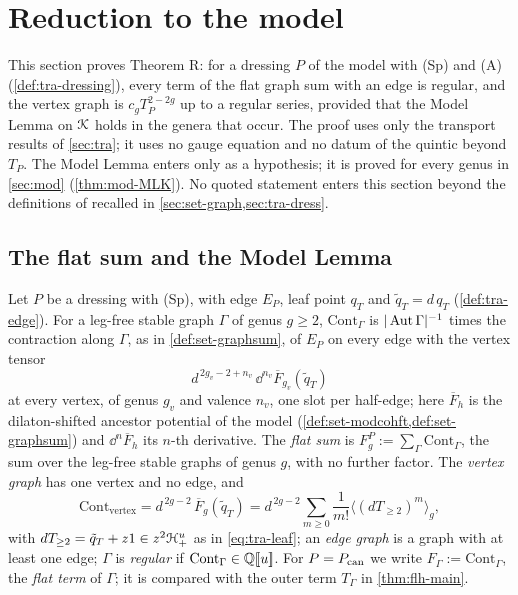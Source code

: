 
\section{Reduction to the model}
\label{sec:red}

This section proves Theorem R: for a dressing $P$ of the model with (Sp) and (A) (\cref{def:tra-dressing}), every term of the flat graph sum with an edge is regular, and the vertex graph is $c_gT_P^{2-2g}$ up to a regular series, provided that the Model Lemma on $\mathcal{K}$ holds in the genera that occur. The proof uses only the transport results of \cref{sec:tra}; it uses no gauge equation and no datum of the quintic beyond $T_P$. The Model Lemma enters only as a hypothesis; it is proved for every genus in \cref{sec:mod} (\cref{thm:mod-MLK}). No quoted statement enters this section beyond the definitions of \cite{PPZ15} recalled in \cref{sec:set-graph,sec:tra-dress}.

\subsection{The flat sum and the Model Lemma}
\label{sec:red-sum}

\begin{defn}
\label{def:red-flatsum}
Let $P$ be a dressing with (Sp), with edge $E_P$, leaf point $q_T$ and $\tilde q_T = d\,q_T$ (\cref{def:tra-edge}). For a leg-free stable graph $\Gamma$ of genus $g\geq 2$, $\mathrm{Cont}_\Gamma$ is $|\operatorname{Aut}\Gamma|^{-1}$ times the contraction along $\Gamma$, as in \cref{def:set-graphsum}, of $E_P$ on every edge with the vertex tensor
\[
d^{\,2g_v-2+n_v}\,\dd^{n_v}\overline F_{g_v}(\tilde q_T)
\]
at every vertex, of genus $g_v$ and valence $n_v$, one slot per half-edge; here $\overline F_h$ is the dilaton-shifted ancestor potential of the model (\cref{def:set-modcohft,def:set-graphsum}) and $\dd^n\overline F_h$ its $n$-th derivative. The \emph{flat sum} is $F^P_g := \sum_\Gamma\mathrm{Cont}_\Gamma$, the sum over the leg-free stable graphs of genus $g$, with no further factor. The \emph{vertex graph} has one vertex and no edge, and
\begin{equation}
\label{eq:red-vertex}
\mathrm{Cont}_{\mathrm{vertex}} = d^{\,2g-2}\,\overline F_g(\tilde q_T) = d^{\,2g-2}\sum_{m\geq 0}\frac1{m!}\langle(dT_{\geq 2})^m\rangle_g ,
\end{equation}
with $dT_{\geq 2} = \tilde q_T+z1\in z^2\mathcal{H}^u_+$ as in \eqref{eq:tra-leaf};
an \emph{edge graph} is a graph with at least one edge; $\Gamma$ is \emph{regular} if $\mathrm{Cont}_\Gamma\in\mathbb{Q}[\![ u ]\!]$. For $P = P_{\mathrm{can}}$ we write $F_\Gamma := \mathrm{Cont}_\Gamma$, the \emph{flat term} of $\Gamma$; it is compared with the outer term $T_\Gamma$ in \cref{thm:flh-main}.
\end{defn}

